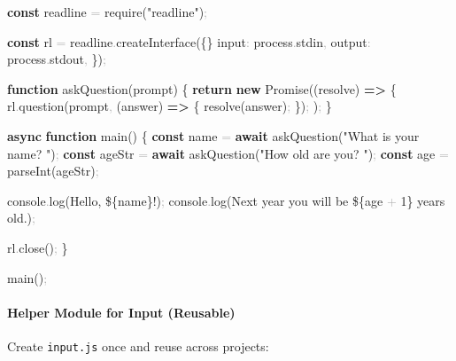 \documentclass[
  justified,
  openright,
]{tufte-book}
\let\subsection\paragraph
\let\paragraph\paragraph
\newcommand{\KeywordTok}[1]{\textcolor{CodeKeyword}{\textbf{#1}}}  %
\newcommand{\StringTok}[1]{\textcolor{CodeString}{#1}}              %
\newcommand{\CodeNumTok}[1]{\textcolor{CodeNumber}{#1}}             %
\newcommand{\CodeFuncTok}[1]{\textcolor{CodeKeyword}{#1}}           %
\newcommand{\CodeTypeTok}[1]{\textcolor{CodeType}{#1}}              %
\newcommand{\CodeAccentTok}[1]{\textcolor{CodeAccent}{#1}}          %
\newcommand{\OperatorTok}[1]{\textcolor{DarkGray}{#1}}              %
\newenvironment{Shaded}{%
  \begin{mdframed}[style=TufteCode]%
}{%
  \end{mdframed}%
}
\let\subsection\paragraph
\let\paragraph\paragraph
\begin{document}
\begin{Shaded}
\begin{Highlighting}[]
\KeywordTok{const} readline \OperatorTok{=} \CodeAccentTok{require}(\StringTok{"readline"})\OperatorTok{;}
 
\KeywordTok{const} rl \OperatorTok{=} readline\OperatorTok{.}\CodeFuncTok{createInterface}(\{\}
  \CodeTypeTok{input}\OperatorTok{:} process\OperatorTok{.}\CodeTypeTok{stdin}\OperatorTok{,}
  \CodeTypeTok{output}\OperatorTok{:} process\OperatorTok{.}\CodeTypeTok{stdout}\OperatorTok{,}
\})\OperatorTok{;}
 
\KeywordTok{function} \CodeFuncTok{askQuestion}(prompt) \{
  \KeywordTok{return} \KeywordTok{new} Promise((resolve) \KeywordTok{=\textgreater{}} \{
    rl\OperatorTok{.}\CodeFuncTok{question}(prompt\OperatorTok{,} (answer) \KeywordTok{=\textgreater{}} \{
      \CodeFuncTok{resolve}(answer)\OperatorTok{;}
    \})\OperatorTok{;}
  )\OperatorTok{;}
\}
 
\KeywordTok{async} \KeywordTok{function} \CodeFuncTok{main}() \{
  \KeywordTok{const} name \OperatorTok{=} \KeywordTok{await} \CodeFuncTok{askQuestion}(\StringTok{"What is your name? "})\OperatorTok{;}
  \KeywordTok{const} ageStr \OperatorTok{=} \KeywordTok{await} \CodeFuncTok{askQuestion}(\StringTok{"How old are you? "})\OperatorTok{;}
  \KeywordTok{const} age \OperatorTok{=} \CodeAccentTok{parseInt}(ageStr)\OperatorTok{;}
 
  console\OperatorTok{.}\CodeFuncTok{log}(\StringTok{\textasciigrave{}Hello, }\StringTok{\$\{}name\StringTok{\}}\StringTok{!\textasciigrave{}})\OperatorTok{;}
  console\OperatorTok{.}\CodeFuncTok{log}(\StringTok{\textasciigrave{}Next year you will be }\StringTok{\$\{}age \OperatorTok{+} \CodeNumTok{1}\StringTok{\}}\StringTok{ years old.\textasciigrave{}})\OperatorTok{;}
 
  rl\OperatorTok{.}\CodeFuncTok{close}()\OperatorTok{;}
\}
 
\CodeFuncTok{main}()\OperatorTok{;}
\end{Highlighting}
\end{Shaded}

\subsection{Helper Module for Input
(Reusable)}\label{helper-module-for-input-reusable}

Create \texttt{input.js} once and reuse across projects:
\end{document}
